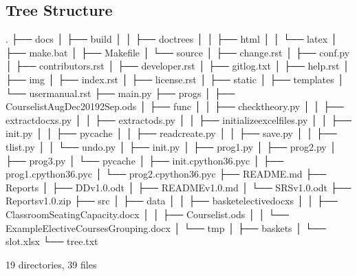 \documentclass[letterpaper,10pt,english]{sphinxmanual}
\begin{document}
\subsection{Tree Structure}
\label{\detokenize{developer:tree-structure}}
\begin{sphinxVerbatim}[commandchars=\\\{\}]
.
├── docs
│   ├── build
│   │   ├── doctrees
│   │   ├── html
│   │   └── latex
│   ├── make.bat
│   ├── Makefile
│   └── source
│       ├── change.rst
│       ├── conf.py
│       ├── contributors.rst
│       ├── developer.rst
│       ├── git\PYGZhy{}log.txt
│       ├── help.rst
│       ├── img
│       ├── index.rst
│       ├── license.rst
│       ├── \PYGZus{}static
│       ├── \PYGZus{}templates
│       └── user\PYGZus{}manual.rst
├── main.py
├── progs
│   ├── CourselistAug\PYGZhy{}Dec2019\PYGZus{}2Sep.ods
│   ├── func
│   │   ├── checktheory.py
│   │   ├── extract\PYGZus{}docxs.py
│   │   ├── extract\PYGZus{}ods.py
│   │   ├── initialize\PYGZus{}excel\PYGZus{}files.py
│   │   ├── \PYGZus{}\PYGZus{}init\PYGZus{}\PYGZus{}.py
│   │   ├── \PYGZus{}\PYGZus{}pycache\PYGZus{}\PYGZus{}
│   │   ├── read\PYGZus{}create.py
│   │   ├── save.py
│   │   ├── tlist.py
│   │   └── undo.py
│   ├── \PYGZus{}\PYGZus{}init\PYGZus{}\PYGZus{}.py
│   ├── prog1.py
│   ├── prog2.py
│   ├── prog3.py
│   └── \PYGZus{}\PYGZus{}pycache\PYGZus{}\PYGZus{}
│       ├── \PYGZus{}\PYGZus{}init\PYGZus{}\PYGZus{}.cpython\PYGZhy{}36.pyc
│       ├── prog1.cpython\PYGZhy{}36.pyc
│       └── prog2.cpython\PYGZhy{}36.pyc
├── README.md
├── Reports
│   ├── DD\PYGZus{}v1.0.odt
│   ├── README\PYGZus{}v1.0.md
│   └── SRS\PYGZus{}v1.0.odt
├── Reports\PYGZus{}v1.0.zip
├── src
│   ├── data
│   │   ├── basket\PYGZus{}elective\PYGZus{}docxs
│   │   ├── ClassroomSeatingCapacity.docx
│   │   ├── Courselist.ods
│   │   └── ExampleElectiveCoursesGrouping.docx
│   └── tmp
│       ├── baskets
│       └── slot.xlsx
└── tree.txt

19 directories, 39 files
\end{sphinxVerbatim}
\end{document}
